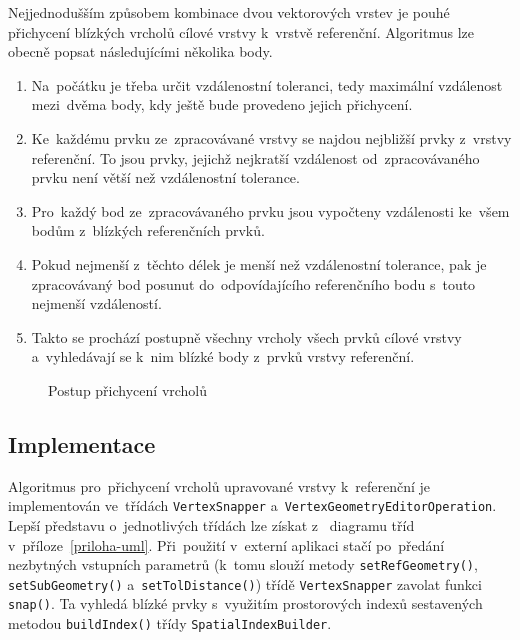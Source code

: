 Nejjednodušším způsobem kombinace dvou vektorových vrstev je pouhé přichycení 
blíz\-kých vrcholů cílové vrstvy k~vrstvě referenční. Algoritmus lze obecně 
popsat následují\-cími několika body.

\begin{enumerate}
 \item Na~počátku je třeba určit vzdálenostní toleranci, tedy maximální 
    vzdálenost mezi~dvě\-ma body, kdy ještě bude provedeno jejich přichycení.
 \item Ke~každému prvku ze~zpracovávané vrstvy se najdou nejbližší prvky 
    z~vrstvy refe\-ren\-ční. To jsou prvky, jejichž nejkratší vzdálenost 
    od~zpracovávaného prvku není větší než vzdálenostní tolerance.
 \item Pro~každý bod ze~zpracovávaného prvku jsou vypočteny vzdálenosti 
    ke~všem bodům z~blízkých referenčních prvků.
 \item Pokud nejmenší z~těchto délek je menší než vzdálenostní tolerance, 
    pak je zpracová\-va\-ný bod posunut do~odpovídajícího referenčního bodu 
    s~touto nejmenší vzdáleností.
 \item Takto se prochází postupně všechny vrcholy všech prvků cílové vrstvy 
    a~vyhledávají se k~nim blízké body z~prvků vrstvy referenční. 
\end{enumerate}

  \begin{figure}[H]
    \centering
      
      \caption{Postup přichycení vrcholů}
      \label{fig:vs-princip}
  \end{figure}


\subsection{Implementace}
\label{vs-implementace}
Algoritmus pro~přichycení vrcholů upravované vrstvy k~referenční 
je implementován ve~tří\-dách \texttt{Vertex\-Snapper} 
a~\texttt{Vertex\-Geometry\-Editor\-Operation}. Lepší představu 
o~jednotlivých tří\-dách lze získat z~ diagramu  tříd
v~příloze~\ref{priloha-uml}. Při~po\-užití v~externí aplikaci 
stačí po~pře\-dání nezbytných vstupních parametrů (k~tomu 
slouží metody \texttt{setRefGeometry()}, \texttt{setSubGeometry()} 
a~\texttt{setTolDistance()}) třídě \texttt{Vertex\-Snapper} zavolat 
funkci \texttt{snap()}. Ta vyhledá blízké prvky s~využitím prostorových 
indexů sesta\-vených metodou \texttt{build\-Index()} třídy 
\texttt{Spatial\-Index\-Builder}.

